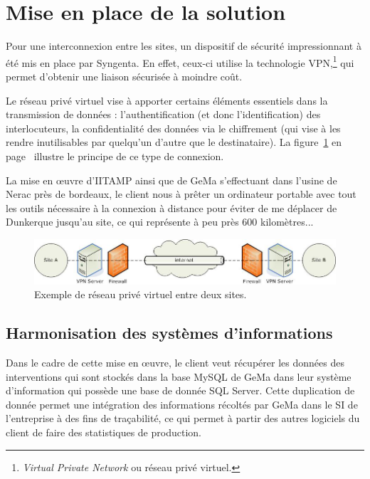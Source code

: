 \section{Mise en place de la solution} %
\label{sec:Mise en place de la solution}

Pour une interconnexion entre les sites, un dispositif de sécurité
impressionnant à été mis en place par Syngenta. En effet, ceux-ci
utilise la technologie VPN,\footnote{\emph{Virtual Private Network} ou
réseau privé virtuel.} qui permet d'obtenir une liaison sécurisée à
moindre coût.

Le réseau privé virtuel vise à apporter certains éléments essentiels
dans la transmission de données : l'authentification (et donc
l'identification) des interlocuteurs, la confidentialité des données via
le chiffrement (qui vise à les rendre inutilisables par quelqu'un
d'autre que le destinataire). La figure~\ref{vpn} en page~\pageref{vpn}
illustre le principe de ce type de connexion.

La mise en \oe{}uvre d'IITAMP ainsi que de GeMa s'effectuant dans
l'usine de Nerac près de bordeaux, le client nous à prêter un ordinateur
portable avec tout les outils nécessaire à la connexion à distance pour
éviter de me déplacer de Dunkerque jusqu'au site, ce qui représente à
peu près 600 kilomètres...

\begin{figure}
  \begin{center}
    \includegraphics[scale=0.5]{images/vpn.png}
    \caption{Exemple de réseau privé virtuel entre deux sites.}
    \label{vpn}
  \end{center}
\end{figure}

\subsection{Harmonisation des systèmes d'informations} %
\label{sub:Harmonisation des systèmes d'informations}

Dans le cadre de cette mise en \oe{}uvre, le client veut récupérer les
données des interventions qui sont stockés dans la base MySQL de GeMa
dans leur système d'information qui possède une base de donnée SQL
Server. Cette duplication de donnée permet une intégration des
informations récoltés par GeMa dans le SI de l'entreprise à des fins de
traçabilité, ce qui permet à partir des autres logiciels du client de
faire des statistiques de production.

